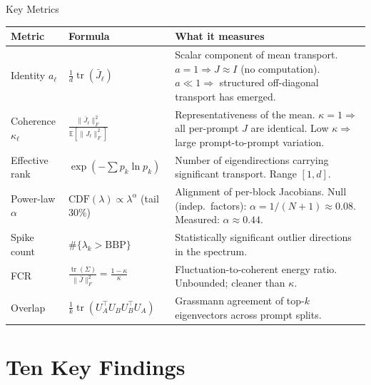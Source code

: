 \documentclass[aspectratio=169,11pt]{beamer}
\begin{document}
\begin{frame}{Key Metrics}
\small
\begin{table}
\begin{tabular}{lp{}p{}}
\toprule
\textbf{Metric} & \textbf{Formula} & \textbf{What it measures} \\
\midrule
Identity $a_\ell$
& $\frac{1}{d}\operatorname{tr}(\bar{J}_\ell)$
& Scalar component of mean transport. $a=1 \Rightarrow J \approx I$ (no computation). $a \ll 1 \Rightarrow$ structured off-diagonal transport has emerged. \\

Coherence $\kappa_\ell$
& $\frac{\|\bar{J}_\ell\|_F^2}{\mathbb{E}[\|J_\ell\|_F^2]}$
& Representativeness of the mean. $\kappa=1 \Rightarrow$ all per-prompt $J$ are identical. Low $\kappa \Rightarrow$ large prompt-to-prompt variation. \\

Effective rank
& $\exp(-\sum p_k \ln p_k)$
& Number of eigendirections carrying significant transport. Range $[1,d]$. \\

Power-law $\alpha$
& $\text{CDF}(\lambda) \propto \lambda^\alpha$ (tail 30\%)
& Alignment of per-block Jacobians. Null (indep.\ factors): $\alpha = 1/(N+1) \approx 0.08$. Measured: $\alpha \approx 0.44$.\\

Spike count
& $\#\{\lambda_k > \text{BBP}\}$
& Statistically significant outlier directions in the spectrum. \\

FCR
& $\frac{\operatorname{tr}(\Sigma)}{\|\bar{J}\|_F^2} = \frac{1-\kappa}{\kappa}$
& Fluctuation-to-coherent energy ratio. Unbounded; cleaner than $\kappa$. \\

Overlap
& $\frac{1}{k}\operatorname{tr}(U_A^\top U_B U_B^\top U_A)$
& Grassmann agreement of top-$k$ eigenvectors across prompt splits. \\

\bottomrule
\end{tabular}
\end{table}
\end{frame}

\section{Ten Key Findings}
\end{document}
